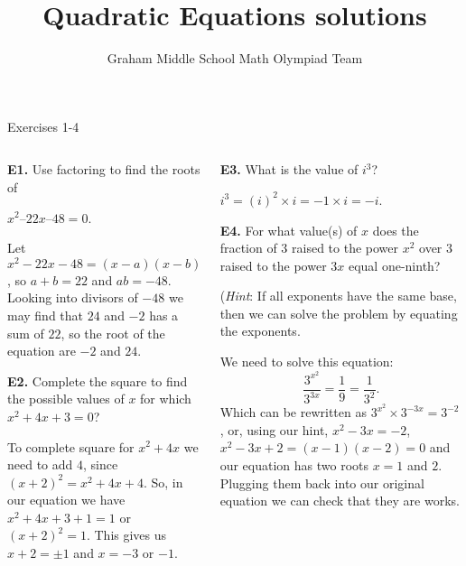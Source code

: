 \documentclass[9pt,aspectratio=169,handout]{beamer}
\title{Quadratic Equations solutions}
\subtitle[Graham Middle School]{Graham Middle School Math Olympiad Team}
\begin{document}
\maketitle


\begin{frame}{Exercises 1-4}
  \begin{columns}[T]
    \begin{column}{0.5\textwidth}
      \begin{problem}
        \textbf{E1.} Use factoring to find the roots of 
        
        $x^2 – 22x – 48 = 0$.
      \end{problem}
      Let $x^2 - 22x - 48 = (x - a)(x - b)$, so $a + b = 22$ and $ab = -48$. Looking into divisors of $-48$ we may find that $24$ and $-2$ has a sum of $22$, so the root of the equation are $\boxed{-2}$ and $\boxed{24}$. 

      \begin{problem}
        \textbf{E2.} Complete the square to find the possible values of $x$ for which $x^2 + 4x + 3 = 0$?
      \end{problem}
      To complete square for $x^2 + 4x$ we need to add $4$, since $(x+2)^2 = x^2 + 4x + 4$. So, in our equation we have $x^2 + 4x + 3 + 1 = 1$ or $(x+2)^2 = 1$. This gives us $x + 2 = \pm 1$ and $x = \boxed{-3}$ or $\boxed{-1}$.

    \end{column}
    \begin{column}{0.5\textwidth}
      \begin{problem}
        \textbf{E3.} What is the value of $i^3$?
      \end{problem}
      $i^3 = (i)^2 \times i = -1 \times i = -i$.
      \begin{problem}
        \textbf{E4.} For what value(s) of $x$ does the fraction of $3$ raised to the power $x^2$ over $3$ raised to the power $3x$ equal one-ninth?  
        
        (\emph{Hint}: If all exponents have the same base, then we can solve the problem by equating the exponents.
      \end{problem}
      We need to solve this equation:
      \[ \frac{3^{x^2}}{3^{3x}} = \frac{1}{9} = \frac{1}{3^2}.\]
      Which can be rewritten as $3^{x^2} \times 3^{-3x} = 3^{-2}$, or, using our hint, $x^2 - 3x = -2$, $x^2 - 3x + 2 = (x - 1)(x - 2) = 0$ and our equation has two roots $x = \boxed{1}$ and $\boxed{2}$. Plugging them back into our original equation we can check that they are works.
    \end{column}
  \end{columns}
\end{frame}
\end{document}
